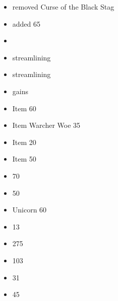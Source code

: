 \largefontsize{}

\subtitle{2023 \betaname{} 2}
\begin{itemize}
	\item removed Curse of the Black Stag
	\item added \oakenmight{} 65
	\item \watcherswoe{} \watcherswoerestriction
	\item streamlining \dryads
	\item streamlining \mistwalkersmirror
	\item \boughofwyscan{} gains \reload
	\item \specialTYPE{} Item \boughofwyscan{} 60 
	\item \specialTYPE{} Item Warcher Woe 35 
	\item \specialTYPE{} Item \drumsofcenyrn{} 20 
	\item \specialTYPE{} Item \hornofthewildhunt{} 50 
	\item \kindred{} \wildhunter{} 70 
	\item \kindred{} \pathfinder{} 50 
	\item \druid{} Unicorn 60 
	\item \forestguardSINGULAR{} \extramodel{} 13 
	\item \kestrelknights{} \basecost{} 275 
	\item \thicketbeasts{} \extramodel{} 103 
	\item \wildhuntsmen{} \extramodel{} 31 
	\item \pathfinders{} \extramodel{} 45 
\end{itemize}
